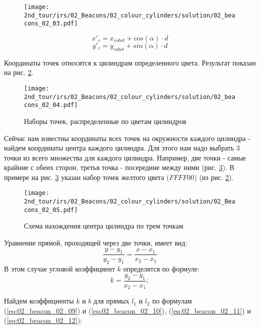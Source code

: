 \begin{figure}[H]
	\centering
	\texttt{[image: 2nd\_tour/irs/02\_Beacons/02\_colour\_cylinders/solution/02\_beacons\_02\_03.pdf]}
	\caption{}
	\label{fig:02_beacons_02_03}
\end{figure}

\begin{equation}
x'_c = x_{robot} + cos(\alpha) \cdot d
\label{eq:02_beacon_02_05}
\end{equation}
\begin{equation}
y'_c = y_{robot} + sin(\alpha) \cdot d
\label{eq:02_beacon_02_06}
\end{equation}

Координаты точек относятся к цилиндрам определенного цвета. Результат показан на рис. \ref{fig:02_beacons_02_04}.

\begin{figure}[H]
	\centering
	\texttt{[image: 2nd\_tour/irs/02\_Beacons/02\_colour\_cylinders/solution/02\_beacons\_02\_04.pdf]}
	\caption{Наборы точек, распределенные по цветам цилиндров}
	\label{fig:02_beacons_02_04}
\end{figure}


Сейчас нам известны координаты всех точек на окружности каждого цилиндра - найдем координаты центра каждого цилиндра.
Для этого нам надо выбрать 3 точки из всего множества для каждого цилиндра. Например, две точки - самые крайние с обеих сторон, третья точка - посередине между ними (рис. \ref{fig:02_beacons_02_05}). В примере на рис. \ref{fig:02_beacons_02_05} указан набор точек желтого цвета ($FFFF00$) (из рис. \ref{fig:02_beacons_02_04}).

\begin{figure}[h]
	\centering
	\texttt{[image: 2nd\_tour/irs/02\_Beacons/02\_colour\_cylinders/solution/02\_Beacons\_02\_05.pdf]}
	\caption{Схема нахождения центра цилиндра по трем точкам}
	\label{fig:02_beacons_02_05}
\end{figure}

Уравнение прямой, проходящей через две точки, имеет вид:
\begin{equation*}
\frac{y-y_1}{y_2-y_1} = \frac{x-x_1}{x_2-x_1}
\end{equation*}
В этом случае угловой коэффициент $k$ определятся по формуле:
\begin{equation*}
k = \frac{y_2-y_1}{x_2-x_1};
\end{equation*}

Найдем коэффициенты $k$ и $b$ для прямых $l_1$ и $l_2$ по формулам (\ref{eq:02_beacon_02_09}) и (\ref{eq:02_beacon_02_10}), (\ref{eq:02_beacon_02_11}) и (\ref{eq:02_beacon_02_12}):

